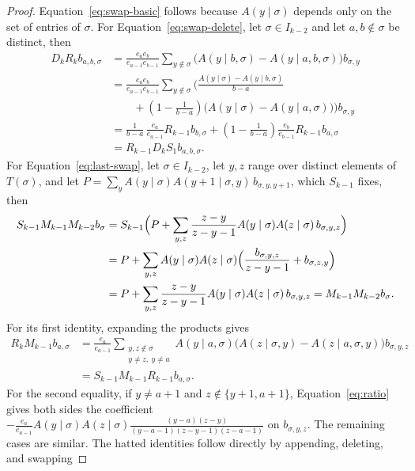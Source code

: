 \documentclass[12pt]{article}
\theoremstyle{plain}
\theoremstyle{definition}
\theoremstyle{remark}
\begin{document}
\begin{proof}
Equation~\eqref{eq:swap-basic} follows because $A(y\mid\sigma)$ depends only
on the set of entries of $\sigma$. For Equation~\eqref{eq:swap-delete},
let $\sigma\in I_{k-2}$ and let $a,b\notin\sigma$ be distinct, then
\begin{align*}
D_kR_kb_{a,b,\sigma}
 &=\frac{e_ae_b}{e_{a-1}e_{b-1}}\sum_{y\notin\sigma}
   \bigl(A(y\mid b,\sigma)-A(y\mid a,b,\sigma)\bigr)b_{\sigma,y}\\
 &=\frac{e_ae_b}{e_{a-1}e_{b-1}}\sum_{y\notin\sigma}
   \biggl(\frac{A(y\mid\sigma)-A(y\mid b,\sigma)}{b-a}\\
 &\qquad+\left(1-\frac1{b-a}\right)
   \bigl(A(y\mid\sigma)-A(y\mid a,\sigma)\bigr)\biggr)b_{\sigma,y}\\
 &=\frac1{b-a}\,\frac{e_a}{e_{a-1}}R_{k-1}b_{b,\sigma}
   +\left(1-\frac1{b-a}\right)\frac{e_b}{e_{b-1}}R_{k-1}b_{a,\sigma}\\
 &=R_{k-1}D_kS_1b_{a,b,\sigma}.
\end{align*}
For Equation~\eqref{eq:last-swap}, let $\sigma\in I_{k-2}$, let $y,z$ range
over distinct elements of $T(\sigma)$, and let
$P=\sum_yA(y\mid\sigma)A(y{+}1\mid\sigma,y)\,b_{\sigma,y,y+1}$, which
$S_{k-1}$ fixes, then
\begin{align*}
S_{k-1}M_{k-1}M_{k-2}b_\sigma
 &=S_{k-1}\Bigl(P+\sum_{y,z}\frac{z-y}{z-y-1}
   A(y\mid\sigma)A(z\mid\sigma)\,b_{\sigma,y,z}\Bigr)\\
 &=P+\sum_{y,z}A(y\mid\sigma)A(z\mid\sigma)
   \Bigl(\frac{b_{\sigma,y,z}}{z-y-1}+b_{\sigma,z,y}\Bigr)\\
 &=P+\sum_{y,z}\frac{z-y}{z-y-1}
   A(y\mid\sigma)A(z\mid\sigma)\,b_{\sigma,y,z}
 =M_{k-1}M_{k-2}b_\sigma.
\end{align*}
For its first identity, expanding the products gives
\begin{align*}
R_kM_{k-1}b_{a,\sigma}
&=\frac{e_a}{e_{a-1}}
 \sum_{\substack{y,z\notin\sigma\\y\ne z,\ y\ne a}}
 A(y\mid a,\sigma)
 \bigl(A(z\mid\sigma,y)-A(z\mid a,\sigma,y)\bigr)b_{\sigma,y,z}\\
&=S_{k-1}M_{k-1}R_{k-1}b_{a,\sigma}.
\end{align*}
For the second equality, if $y\ne a+1$ and $z\notin\{y+1,a+1\}$, Equation~\eqref{eq:ratio} gives both sides the coefficient $-\frac{e_a}{e_{a-1}}A(y\mid\sigma)A(z\mid\sigma)\frac{(y-a)(z-y)}{(y-a-1)(z-y-1)(z-a-1)}$ on $b_{\sigma,y,z}$. The remaining cases are similar.
The hatted identities follow directly by appending, deleting, and swapping

\end{proof}
\end{document}
